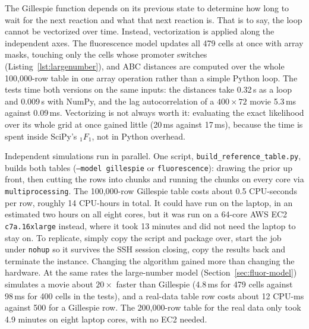 The Gillespie function depends on its previous state to determine how long to wait for the next reaction and what that next reaction is. That is to say, the loop cannot be vectorized over time. Instead, vectorization is applied along the independent axes. The fluorescence model updates all 479 cells at once with array masks, touching only the cells whose promoter switches (Listing~\ref{lst:largenumber}), and ABC distances are computed over the whole 100,000-row table in one array operation rather than a simple Python loop. The tests time both versions on the same inputs: the distances take 0.32\,s as a loop and 0.009\,s with NumPy, and the lag autocorrelation of a $400\times72$ movie 5.3\,ms against 0.09\,ms. Vectorizing is not always worth it: evaluating the exact likelihood over its whole grid at once gained little (20\,ms against 17\,ms), because the time is spent inside SciPy's ${}_1F_1$, not in Python overhead.

Independent simulations run in parallel. One script, \texttt{build\_reference\_table.py}, builds both tables (\texttt{--model gillespie} or \texttt{fluorescence}): drawing the prior up front, then cutting the rows into chunks and running the chunks on every core via \texttt{multiprocessing}. The 100,000-row Gillespie table costs about 0.5 CPU-seconds per row, roughly 14 CPU-hours in total. It could have run on the laptop, in an estimated two hours on all eight cores, but it was run on a 64-core AWS EC2 \texttt{c7a.16xlarge} instead, where it took 13 minutes and did not need the laptop to stay on. To replicate, simply copy the script and package over, start the job under \texttt{nohup} so it survives the SSH session closing, copy the results back and terminate the instance. Changing the algorithm gained more than changing the hardware. At the same rates the large-number model (Section~\ref{sec:fluor-model}) simulates a movie about $20\times$ faster than Gillespie (4.8\,ms for 479 cells against 98\,ms for 400 cells in the tests), and a real-data table row costs about 12 CPU-ms against 500 for a Gillespie row. The 200,000-row table for the real data only took 4.9 minutes on eight laptop cores, with no EC2 needed.

